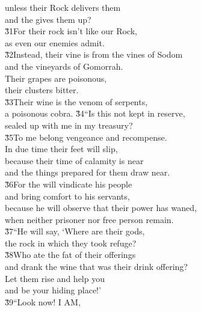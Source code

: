 \begin{poetry}
\poeml unless their Rock delivers them \\
\poemll    and the  gives them up? \\
\poeml \v{31}For their rock isn't like our Rock, \\
\poemll    as even our enemies admit. \\
\poeml \v{32}Instead, their vine is from the vines of Sodom \\
\poemll    and the vineyards of Gomorrah. \\
\poeml Their grapes are poisonous, \\
\poemll    their clusters bitter. \\
\poeml \v{33}Their wine is the venom of serpents, \\
\poemll    a poisonous cobra.
\poeml \v{34}``Is this not kept in reserve, \\
\poemll    sealed up with me in my treasury? \\
\poeml \v{35}To me belong vengeance and recompense. \\
\poemll    In due time their feet will slip, \\
\poeml because their time of calamity is near \\
\poemll    and the things prepared for them draw near. \\
\poeml \v{36}For the  will vindicate his people \\
\poemll    and bring comfort to his servants, \\
\poeml because he will observe that their power has waned, \\
\poemll    when neither prisoner nor free person remain. \\
\poeml \v{37}``He will say, `Where are their gods, \\
\poemll    the rock in which they took refuge? \\
\poeml \v{38}Who ate the fat of their offerings \\
\poemll    and drank the wine that was their drink offering? \\
\poeml Let them rise and help you \\
\poemll    and be your hiding place!' \\
\poeml \v{39}``Look now! I AM, \\

\end{poetry}
